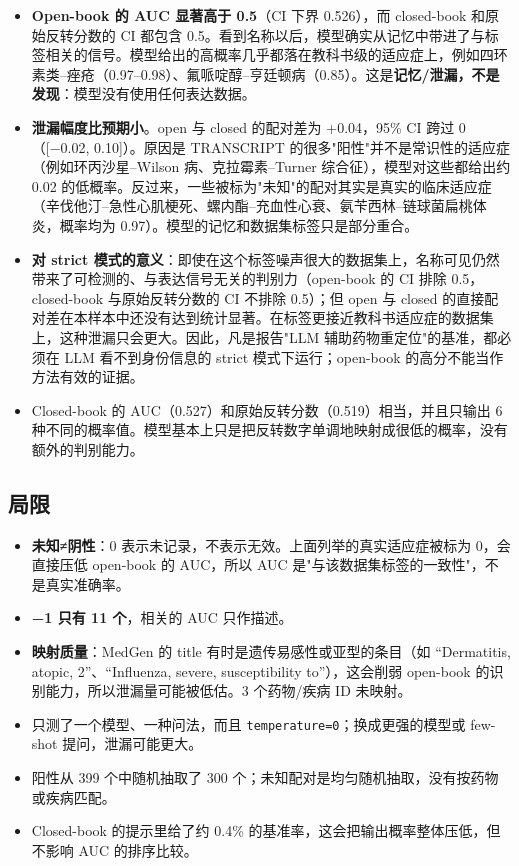 \documentclass[
  10pt,
]{ctexart}
\providecommand{\tightlist}{%
  \setlength{\itemsep}{0pt}\setlength{\parskip}{0pt}}
\begin{document}
\begin{itemize}
\tightlist
\item
  \textbf{Open-book 的 AUC 显著高于 0.5}（CI 下界 0.526），而
  closed-book 和原始反转分数的 CI 都包含
  0.5。看到名称以后，模型确实从记忆中带进了与标签相关的信号。模型给出的高概率几乎都落在教科书级的适应症上，例如四环素类--痤疮（0.97--0.98）、氟哌啶醇--亨廷顿病（0.85）。这是\textbf{记忆/泄漏，不是发现}：模型没有使用任何表达数据。
\item
  \textbf{泄漏幅度比预期小}。open 与 closed 的配对差为 +0.04，95\% CI
  跨过 0（{[}−0.02, 0.10{]}）。原因是 TRANSCRIPT
  的很多"阳性"并不是常识性的适应症（例如环丙沙星--Wilson
  病、克拉霉素--Turner 综合征），模型对这些都给出约 0.02
  的低概率。反过来，一些被标为"未知"的配对其实是真实的临床适应症（辛伐他汀--急性心肌梗死、螺内酯--充血性心衰、氨苄西林--链球菌扁桃体炎，概率均为
  0.97）。模型的记忆和数据集标签只是部分重合。
\item
  \textbf{对 strict
  模式的意义}：即使在这个标签噪声很大的数据集上，名称可见仍然带来了可检测的、与表达信号无关的判别力（open-book
  的 CI 排除 0.5，closed-book 与原始反转分数的 CI 不排除 0.5）；但 open
  与 closed
  的直接配对差在本样本中还没有达到统计显著。在标签更接近教科书适应症的数据集上，这种泄漏只会更大。因此，凡是报告"LLM
  辅助药物重定位"的基准，都必须在 LLM 看不到身份信息的 strict
  模式下运行；open-book 的高分不能当作方法有效的证据。
\item
  Closed-book 的 AUC（0.527）和原始反转分数（0.519）相当，并且只输出 6
  种不同的概率值。模型基本上只是把反转数字单调地映射成很低的概率，没有额外的判别能力。
\end{itemize}

\subsection{局限}\label{ux5c40ux9650}

\begin{itemize}
\tightlist
\item
  \textbf{未知≠阴性}：0
  表示未记录，不表示无效。上面列举的真实适应症被标为 0，会直接压低
  open-book 的 AUC，所以 AUC
  是"与该数据集标签的一致性"，不是真实准确率。
\item
  \textbf{−1 只有 11 个}，相关的 AUC 只作描述。
\item
  \textbf{映射质量}：MedGen 的 title 有时是遗传易感性或亚型的条目（如
  ``Dermatitis, atopic, 2''、``Influenza, severe, susceptibility
  to''），这会削弱 open-book 的识别能力，所以泄漏量可能被低估。3
  个药物/疾病 ID 未映射。
\item
  只测了一个模型、一种问法，而且
  \texttt{temperature=0}；换成更强的模型或 few-shot 提问，泄漏可能更大。
\item
  阳性从 399 个中随机抽取了 300
  个；未知配对是均匀随机抽取，没有按药物或疾病匹配。
\item
  Closed-book 的提示里给了约 0.4\%
  的基准率，这会把输出概率整体压低，但不影响 AUC 的排序比较。
\end{itemize}
\end{document}
